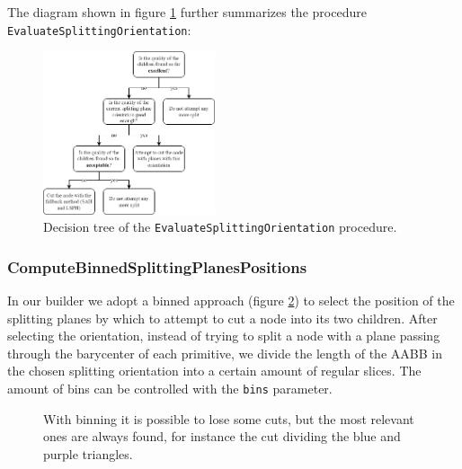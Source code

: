 \documentclass[acmtog, anonymous, review]{acmart}
\begin{document}
The diagram shown in figure \ref{fig:evaluate_splitting_plane} further summarizes the procedure \\\texttt{EvaluateSplittingOrientation}:

\begin{figure}[H]
  \centering
  \includegraphics[width=0.45\textwidth]{Images/evaluate_splitting_plane.png}
  \caption{Decision tree of the \texttt{EvaluateSplittingOrientation} procedure.}
  \label{fig:evaluate_splitting_plane} 
\end{figure}

\subsubsection{ComputeBinnedSplittingPlanesPositions}
In our builder we adopt a binned approach (figure \ref{fig:triangles_splitting_binning}) to select the position of the splitting planes by which to attempt to cut a node into its two children. After selecting the orientation, instead of trying to split a node with a plane passing through the barycenter of each primitive, we divide the length of the AABB in the chosen splitting orientation into a certain amount of regular slices. The amount of bins can be controlled with the \texttt{bins} parameter.

\begin{figure}
  \quad
  \caption{With binning it is possible to lose some cuts, but the most relevant ones are always found, for instance the cut dividing the blue and purple triangles.}
  \label{fig:triangles_splitting_binning}
\end{figure}
\end{document}
